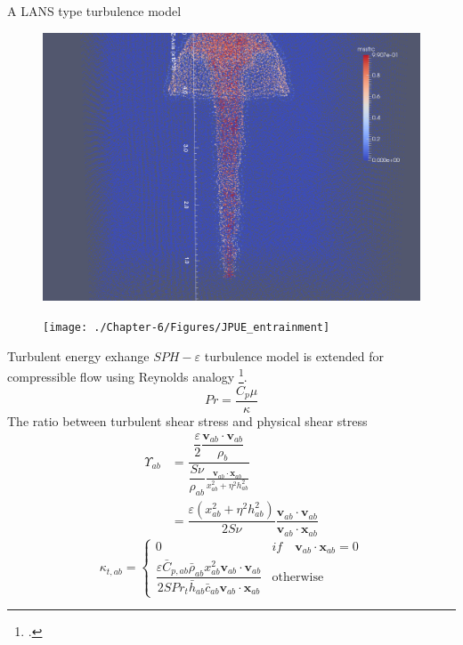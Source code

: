 \documentclass{beamer}
\begin{document}
\begin{frame}{A LANS type turbulence model}
\begin{minipage}{0.34 \textwidth}
\begin{figure}
\includegraphics[width=0.80 \textwidth]{./PPT/No_turb}
\end{figure}
%
\begin{figure}
\texttt{[image: ./Chapter-6/Figures/JPUE\_entrainment]}
\end{figure}
\end{minipage}
\end{frame}

\begin{frame}{Turbulent energy exhange}
$SPH-\varepsilon$ turbulence model is extended for compressible flow using Reynolds analogy \footcite{gmd-2017-119}.
\begin{equation}
Pr=\dfrac{C_p \mu}{\kappa}
\end{equation}
The ratio between turbulent shear stress and physical shear stress %
\begin{equation}
\begin{split}
\Upsilon_{ab} &= \dfrac{\dfrac{\varepsilon}{2} \dfrac{\textbf{v}_{ab} \cdot \textbf{v}_{ab}}{\rho_b}}{\dfrac{S \nu}{\rho_{ab}} \frac{\textbf{v}_{ab} \cdot \textbf{x}_{ab}}{x_{ab}^2 + \eta^2 h_{ab}^2}} \\
 & = \dfrac{\varepsilon \left(x_{ab}^2 + \eta^2 h_{ab}^2\right)}{2 S \nu} \dfrac{\textbf{v}_{ab} \cdot \textbf{v}_{ab}}{\textbf{v}_{ab} \cdot \textbf{x}_{ab}}
\end{split}
\end{equation}
\begin{equation}
\kappa_{t,ab}= 
\begin{cases} 
      0 & if \quad \textbf{v}_{ab} \cdot \textbf{x}_{ab} = 0 \\
      \dfrac{\varepsilon \bar{C}_{p,ab} \bar{\rho}_{ab} x_{ab}^2 \textbf{v}_{ab} \cdot \textbf{v}_{ab}}{2 S Pr_t \bar{h}_{ab} \bar{c}_{ab} \textbf{v}_{ab} \cdot \textbf{x}_{ab} } & \text{otherwise}
\end{cases}
\label{eq:SPH-LANS-heat-conductivity}
\end{equation}
\end{frame}
\end{document}
